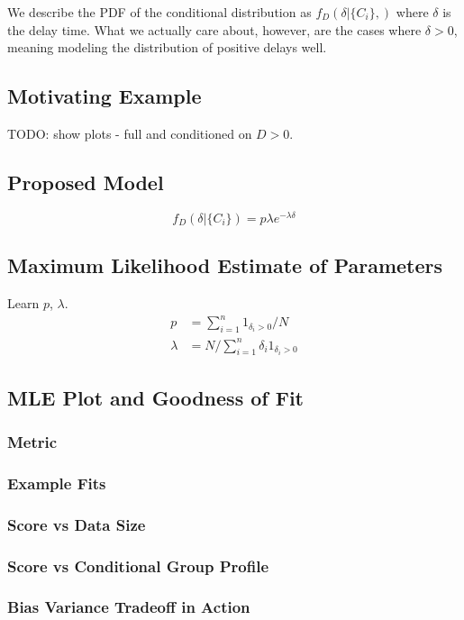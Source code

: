 \documentclass{article}
\begin{document}
We describe the PDF of the conditional distribution as $f_D(\delta|\{C_i\}, )$ where $\delta$ is the delay time. What we actually care about, however, are
the cases where $\delta > 0$, meaning modeling the distribution of positive delays well.

\subsection{Motivating Example}
TODO: show plots - full and conditioned on $D > 0$.

\subsection{Proposed Model}
$$f_D(\delta|\{C_i\}) = p\lambda e^{-\lambda \delta}$$

\subsection{Maximum Likelihood Estimate of Parameters}
Learn $p$, $\lambda$.
\begin{align*}
    p &= \sum_{i=1}^n 1_{\delta_i > 0} / N \\
    \lambda &= N / \sum_{i=1}^n \delta_i 1_{\delta_i > 0}
\end{align*}

\subsection{MLE Plot and Goodness of Fit}
\subsubsection{Metric}
\subsubsection{Example Fits}
\subsubsection{Score vs Data Size}
\subsubsection{Score vs Conditional Group Profile}
\subsubsection{Bias Variance Tradeoff in Action}
\end{document}
